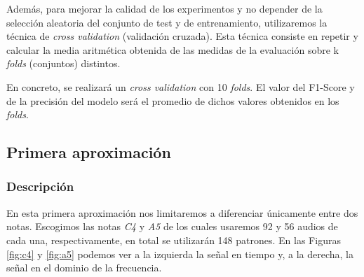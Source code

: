 \documentclass[12pt]{article}
\begin{document}
\bigskip
Además, para mejorar la calidad de los experimentos y no depender de la selección aleatoria del conjunto de test y de entrenamiento, utilizaremos
la técnica de \textit{cross validation} (validación cruzada). Esta técnica consiste en repetir y calcular la media aritmética obtenida de las medidas de la evaluación 
sobre k \textit{folds} (conjuntos) distintos.

En concreto, se realizará un \textit{cross validation} con 10 \textit{folds}. El valor del F1-Score y de la precisión
del modelo será el promedio de dichos valores obtenidos en los \textit{folds}.

\subsection{Primera aproximación}
\label{Primera aproximación}

\subsubsection{Descripción}
En esta primera aproximación nos limitaremos a diferenciar únicamente entre dos notas. 
Escogimos las notas \textit{C4} y \textit{A5} de los cuales usaremos 92 y 56 audios de cada una, respectivamente, en total
se utilizarán 148 patrones. En las Figuras \ref{fig:c4} y \ref{fig:a5} podemos ver a la izquierda la señal en tiempo y, a la derecha,
la señal en el dominio de la frecuencia.
\end{document}
